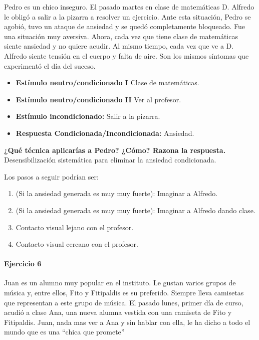 \documentclass[palatino,nochap]{apuntesURJC}
\begin{document}
\begin{example}
Pedro es un chico inseguro. El pasado martes en clase de matemáticas D. Alfredo le obligó a salir a la pizarra a resolver un ejercicio. Ante esta situación, Pedro se agobió, tuvo un ataque de ansiedad y se quedó completamente bloqueado. Fue una situación muy aversiva. Ahora, cada vez que tiene clase de matemáticas siente ansiedad y no quiere acudir. Al mismo tiempo, cada vez que ve a D. Alfredo siente tensión en el cuerpo y falta de aire. Son los mismos síntomas que experimentó el día del suceso.

\begin{itemize}
\item \textbf{Estímulo neutro/condicionado I} Clase de matemáticas.
\item \textbf{Estímulo neutro/condicionado II} Ver al profesor.
\item \textbf{Estímulo incondicionado:} Salir a la pizarra.
\item \textbf{Respuesta Condicionada/Incondicionada:} Ansiedad.
\end{itemize}

\textbf{¿Qué técnica aplicarías a Pedro? ¿Cómo? Razona la respuesta.} Desensibilización sistemática para eliminar la ansiedad condicionada.

Los pasos a seguir podrían ser:

\begin{enumerate}
	\item (Si la ansiedad generada es muy muy fuerte): Imaginar a Alfredo.
	\item (Si la ansiedad generada es muy muy fuerte): Imaginar a Alfredo dando clase.
	\item Contacto visual lejano con el profesor.
	\item Contacto visual cercano con el profesor.
\end{enumerate}

\paragraph{Ejercicio 6}

Juan es un alumno muy popular en el instituto. Le gustan varios grupos de música y, entre ellos, Fito y Fitipaldis es su preferido. Siempre lleva camisetas que representan a este grupo de música. El pasado lunes, primer día de curso, acudió a clase Ana, una nueva alumna vestida con una camiseta de Fito y Fitipaldis. Juan, nada mas ver a Ana y sin hablar con ella, le ha dicho a todo el mundo que es una “chica que promete”


\end{example}
\end{document}
